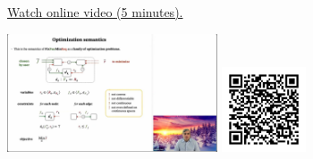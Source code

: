 
\begin{minipage}{10cm}
    \href{https://act4e-spring21.netlify.app/videos/spring2021-functorial-comp-a:optimization-semantics.html}{Watch online video (5 minutes).}
        
    \href{https://act4e-spring21.netlify.app/videos/spring2021-functorial-comp-a:optimization-semantics.html}{\includegraphics[height=3.5cm]{spring2021-functorial-comp-a:optimization-semantics/thumbnails.jpg}}
    \href{https://act4e-spring21.netlify.app/videos/spring2021-functorial-comp-a:optimization-semantics.html}{\includegraphics[height=2.5cm]{spring2021-functorial-comp-a:optimization-semantics/qrcode.png}}
\end{minipage}
